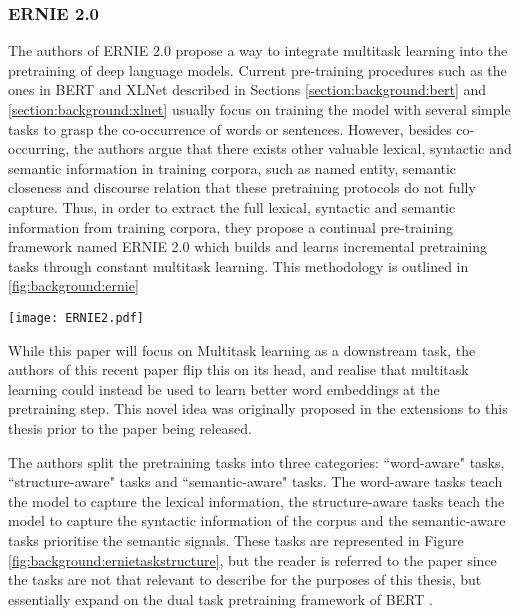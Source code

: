 {{\subsubsection{ERNIE 2.0}
The authors of ERNIE 2.0 \cite{Sun2019a} propose a way to integrate multitask learning into the pretraining of deep language models. Current pre-training procedures such as the ones in BERT \cite{Devlin2018} and XLNet \cite{Yang2019} described in Sections \ref{section:background:bert} and \ref{section:background:xlnet} usually focus on training the model with several simple tasks to grasp the co-occurrence of words or sentences. However, besides co-occurring, the authors argue that there exists other valuable lexical, syntactic and semantic information in training corpora, such as named entity, semantic closeness and discourse relation that these pretraining protocols do not fully capture. Thus, in order to extract the full lexical, syntactic and semantic information from training corpora, they propose a continual pre-training framework named ERNIE 2.0 which builds and learns incremental pretraining tasks through constant multitask learning. This methodology is outlined in \ref{fig:background:ernie}

\begin{center}
	\texttt{[image: ERNIE2.pdf]}
	\label{fig:background:ernie}
\end{center}

While this paper will focus on Multitask learning as a downstream task, the authors of this recent paper flip this on its head, and realise that multitask learning could instead be used to learn better word embeddings at the pretraining step. This novel idea was originally proposed in the extensions to this thesis prior to the paper being released.

The authors split the pretraining tasks into three categories: ``word-aware" tasks, ``structure-aware" tasks and ``semantic-aware" tasks. The word-aware tasks teach the model to capture the lexical information, the structure-aware tasks teach the model to capture the syntactic information of the corpus and the semantic-aware tasks prioritise the semantic signals. These tasks are represented in Figure \ref{fig:background:ernietaskstructure}, but the reader is referred to the paper \cite{Sun2019a} since the tasks are not that relevant to describe for the purposes of this thesis, but essentially expand on the dual task pretraining framework of BERT \cite{Devlin2018}.

}}

